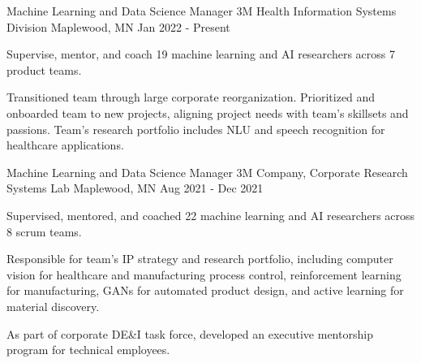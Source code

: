 

\begin{cventries}

  \cventry
    {Machine Learning and Data Science Manager} %
    {3M Health Information Systems Division} %
    {Maplewood, MN} %
    {Jan 2022 - Present} %
    {
      \begin{cvitems} %
      \item {Supervise, mentor, and coach 19 machine learning and AI researchers across 7 product teams.}
      \item{Transitioned team through large corporate reorganization. Prioritized and onboarded team to new projects, aligning project needs with team's skillsets and passions. Team's research portfolio includes NLU and speech recognition for healthcare applications.}
      \end{cvitems}
    }

  \cventry
    {Machine Learning and Data Science Manager} %
    {3M Company, Corporate Research Systems Lab} %
    {Maplewood, MN} %
    {Aug 2021 - Dec 2021} %
    {
      \begin{cvitems} %
      \item {Supervised, mentored, and coached 22 machine learning and AI researchers across 8 scrum
          teams.}
      \item{Responsible for team's IP strategy and research portfolio, including computer
          vision for healthcare and manufacturing process control, reinforcement learning
          for manufacturing, GANs for automated product design, and active learning for
          material discovery.}
      \item{As part of corporate DE\&I task force, developed an executive mentorship
          program for technical employees.}
      \end{cvitems}
    }


\end{cventries}
